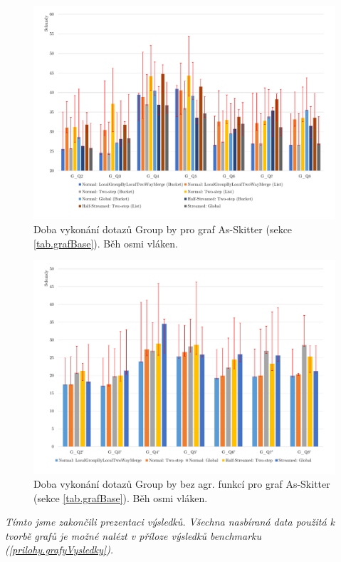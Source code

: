 \begin{figure}[!htp]
\includegraphics[width=\linewidth]{../img/skitterGroupByPar.pdf}\centering
\caption{Doba vykonání dotazů Group by pro graf As-Skitter (sekce \ref{tab.grafBase}). Běh osmi vláken.}
\label{figure.skitterGroupByPar}
\end{figure}
\begin{figure}[!htp]
\includegraphics[width=\linewidth]{../img/skitterGroupByParNoAgg.pdf}\centering
\caption{Doba vykonání dotazů Group by bez agr. funkcí pro graf As-Skitter (sekce \ref{tab.grafBase}). Běh osmi vláken.}
\label{figure.skitterGroupByParNoAgg}
\end{figure}
\bigskip

\clearpage

\textit{Tímto jsme zakončili prezentaci výsledků. Všechna nasbíraná data použitá k tvorbě grafů je možné nalézt v příloze výsledků benchmarku (\ref{prilohy.grafyVysledky}).} 
